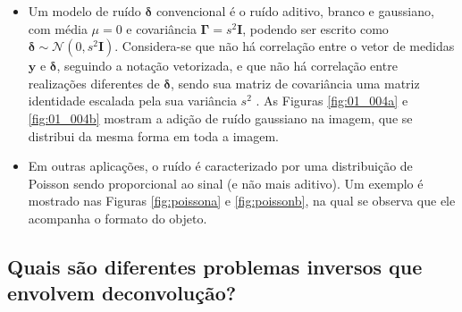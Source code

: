\begin{itemize}
\item  Um modelo de ruído $\bm{\delta}$ convencional é o ruído aditivo, branco e gaussiano, com média $\mu = 0$ e covariância $ \mathbf{\Gamma} = s^2 \mathbf{I}$, podendo ser escrito como $\bm{\delta} \sim \mathcal{N}(0,s^{2} \mathbf{I})$. Considera-se que não há correlação entre o vetor de medidas $\mathbf{y}$ e $\bm{\delta}$, seguindo a notação vetorizada,  e que não há correlação entre realizações diferentes de $\bm{\delta}$, sendo sua matriz de covariância  uma matriz identidade escalada pela sua variância $s^2$ \cite[seção 3.5.1]{hansen2010discrete}. As Figuras \ref{fig:01_004a} e  \ref{fig:01_004b} mostram a adição de ruído gaussiano na imagem, que se distribui da mesma forma em toda a imagem. 
 
  \item  Em outras aplicações, o ruído é caracterizado por uma distribuição de Poisson \cite{Bertero2009} sendo proporcional ao sinal (e não mais aditivo). Um exemplo é mostrado nas Figuras \ref{fig:poissona} e \ref{fig:poissonb}, na qual se observa que ele acompanha o formato do objeto.
  
  \end{itemize}
  
 
\subsection{Quais são diferentes problemas inversos que envolvem deconvolução?}

